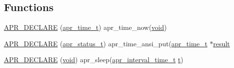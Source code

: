 \subsection*{Functions}
\begin{DoxyCompactItemize}
\item 
\hyperlink{group__apr__time_ga0151b93f22f81f7b1af9bc4dfcd11f86}{A\+P\+R\+\_\+\+D\+E\+C\+L\+A\+RE} (\hyperlink{group__apr__time_gadb4bde16055748190eae190c55aa02bb}{apr\+\_\+time\+\_\+t}) apr\+\_\+time\+\_\+now(\hyperlink{group__MOD__ISAPI_gacd6cdbf73df3d9eed42fa493d9b621a6}{void})
\item 
\hyperlink{group__apr__time_ga57bfe39a9516843a151a65cd02f84616}{A\+P\+R\+\_\+\+D\+E\+C\+L\+A\+RE} (\hyperlink{group__apr__errno_gaa5105fa83cc322f09382292db8b47593}{apr\+\_\+status\+\_\+t}) apr\+\_\+time\+\_\+ansi\+\_\+put(\hyperlink{group__apr__time_gadb4bde16055748190eae190c55aa02bb}{apr\+\_\+time\+\_\+t} $\ast$\hyperlink{pcretest_8txt_ada864abbb1600264b4da826e87c60355}{result}
\item 
\hyperlink{group__apr__time_ga82e8a0064bc8dd25ef73f39ea428a585}{A\+P\+R\+\_\+\+D\+E\+C\+L\+A\+RE} (\hyperlink{group__MOD__ISAPI_gacd6cdbf73df3d9eed42fa493d9b621a6}{void}) apr\+\_\+sleep(\hyperlink{group__apr__time_gaae2129185a395cc393f76fabf4f43e47}{apr\+\_\+interval\+\_\+time\+\_\+t} \hyperlink{pcretest_8txt_a9ffb27fb8e1f90c17b13303fee2fb883}{t})
\end{DoxyCompactItemize}
